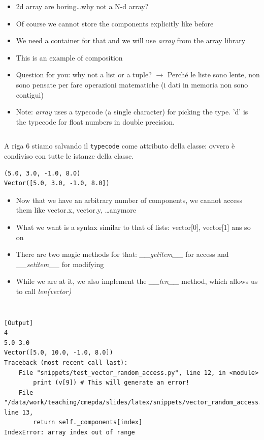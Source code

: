   \begin{itemize}
    \item 2d array are boring\dots why not a N-d array?
    \item Of course we cannot store the components explicitly like before
    \item We need a container for that and we will use \emph{array} from the 
          array library
    \item This is an example of \alert{composition}
   
    \item Question for you: why not a list or a tuple? $\rightarrow$ Perché le liste sono lente, non sono pensate per fare operazioni matematiche (i dati in memoria non sono contigui) 
    \item Note: \emph{array} uses a typecode (a single character) for picking the
          type. 'd' is the typecode for float numbers in double precision. 
  \end{itemize}
  
  
\inputminted{python}{snippets/vector.py}
A riga 6 stiamo salvando il \texttt{typecode} come attributo della classe: ovvero è condiviso con tutte le istanze della classe.
\begin{verbatim}
(5.0, 3.0, -1.0, 8.0)
Vector([5.0, 3.0, -1.0, 8.0])
\end{verbatim}

  \begin{itemize}
    \item Now that we have an arbitrary number of components, we cannot access them like 
          vector.x, vector.y, \dots anymore
    \item What we want is a syntax similar to that of lists: vector[0], vector[1]
          ans so on
    \item There are two magic methods for that: \emph{\_\_getitem\_\_} for access 
          and \emph{\_\_setitem\_\_} for modifying
    \item While we are at it, we also implement the \emph{\_\_len\_\_} method,
          which allows us to call \emph{len(vector)}
  \end{itemize}
  
\inputminted{python}{snippets/vector_random_access.py}

\inputminted{python}{snippets/test_vector_random_access.py}

\begin{verbatim}
[Output]
4
5.0 3.0
Vector([5.0, 10.0, -1.0, 8.0])
Traceback (most recent call last):
    File "snippets/test_vector_random_access.py", line 12, in <module>
        print (v[9]) # This will generate an error!
    File "/data/work/teaching/cmepda/slides/latex/snippets/vector_random_access.py", line 13,
        return self._components[index]
IndexError: array index out of range
\end{verbatim}  

